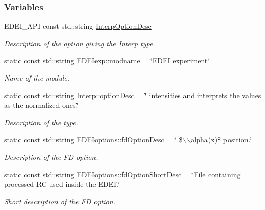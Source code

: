 \subsubsection*{Variables}
\begin{DoxyCompactItemize}
\item 
EDEI\_\-API const std::string \hyperlink{group__edeiedei_ga8937835900a2532f1c8b381e81288b91}{InterpOptionDesc}
\begin{DoxyCompactList}\small\item\em Description of the option giving the \hyperlink{classInterp}{Interp} type. \item\end{DoxyCompactList}\item 
static const std::string \hyperlink{group__edeiedei_ga6dfda2e4cb9d61720e2db926b65d6dbe}{EDEIexp::modname} = \char`\"{}EDEI experiment\char`\"{}
\begin{DoxyCompactList}\small\item\em Name of the module. \item\end{DoxyCompactList}\item 
static const std::string \hyperlink{group__edeiedei_gad0a1bf1abf92a9db8a77c55470a31027}{Interp::optionDesc} = \char`\"{} intensities and interprets the values as the normalized ones.\char`\"{}
\begin{DoxyCompactList}\small\item\em Description of the type. \item\end{DoxyCompactList}\item 
static const std::string \hyperlink{group__edeiedei_ga1d5c3f1289ef962d44d52f344e932369}{EDEIoptions::fdOptionDesc} = \char`\"{} \$$\backslash$$\backslash$alpha(x)\$ position.\char`\"{}
\begin{DoxyCompactList}\small\item\em Description of the FD option. \item\end{DoxyCompactList}\item 
static const std::string \hyperlink{group__edeiedei_ga270b21583b3f075758bd30fd3df8f7fa}{EDEIoptions::fdOptionShortDesc} = \char`\"{}File containing processed RC used inside the EDEI.\char`\"{}
\begin{DoxyCompactList}\small\item\em Short description of the FD option. \item\end{DoxyCompactList}\item 
$$
\end{DoxyCompactItemize}
